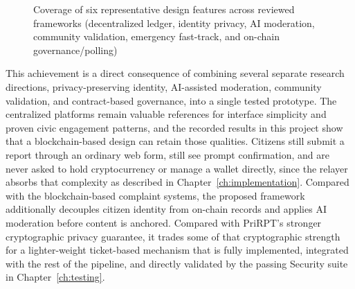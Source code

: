 \begin{figure}[!htb]
    \centering
    \caption{Coverage of six representative design features across reviewed frameworks (decentralized ledger, identity privacy, AI moderation, community validation, emergency fast-track, and on-chain governance/polling)}
    \label{fig:feature-comparison-chart}
\end{figure}

This achievement is a direct consequence of combining several separate research directions, privacy-preserving identity, AI-assisted moderation, community validation, and contract-based governance, into a single tested prototype. The centralized platforms remain valuable references for interface simplicity and proven civic engagement patterns, and the recorded results in this project show that a blockchain-based design can retain those qualities. Citizens still submit a report through an ordinary web form, still see prompt confirmation, and are never asked to hold cryptocurrency or manage a wallet directly, since the relayer absorbs that complexity as described in Chapter~\ref{ch:implementation}. Compared with the blockchain-based complaint systems, the proposed framework additionally decouples citizen identity from on-chain records and applies AI moderation before content is anchored. Compared with PriRPT's stronger cryptographic privacy guarantee, it trades some of that cryptographic strength for a lighter-weight ticket-based mechanism that is fully implemented, integrated with the rest of the pipeline, and directly validated by the passing Security suite in Chapter~\ref{ch:testing}.

